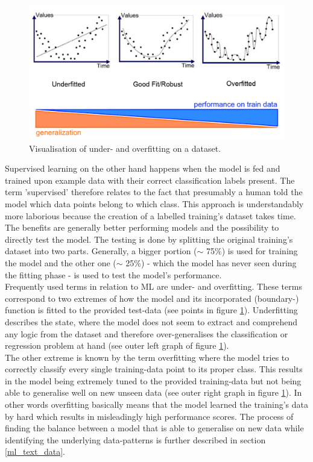 \begin{figure}[h]
   \centering
   \includegraphics[width=\textwidth]{img/over_underfitting}
   \caption{Visualisation of under- and overfitting on a dataset.}
   \label{fig:over_underfitting}
\end{figure}

Supervised learning on the other hand happens when the model is fed and trained upon example data with their correct classification labels present. The term 'supervised' therefore relates to the fact that presumably a human told the model which data points belong to which class. This approach is understandably more laborious because the creation of a labelled training's dataset takes time. The benefits are generally better performing models and the possibility to directly test the model. The testing is done by splitting the original training's dataset into two parts. Generally, a bigger portion ($\sim$ 75\%) is used for training the model and the other one ($\sim$ 25\%) - which the model has never seen during the fitting phase - is used to test the model's performance. \\
\newline
Frequently used terms in relation to ML are under- and overfitting. These terms correspond to two extremes of how the model and its incorporated (boundary-) function is fitted to the provided test-data (see points in figure \ref{fig:over_underfitting}). Underfitting describes the state, where the model does not seem to extract and comprehend any logic from the dataset and therefore over-generalises the classification or regression problem at hand (see outer left graph of figure \ref{fig:over_underfitting}). \\
The other extreme is known by the term overfitting where the model tries to correctly classify every single training-data point to its proper class. This results in the model being extremely tuned to the provided training-data but not being able to generalise well on new unseen data (see outer right graph in figure \ref{fig:over_underfitting}). In other words overfitting basically means that the model learned the training's data by hard which results in misleadingly high performance scores. The process of finding the balance between a model that is able to generalise on new data while identifying the underlying data-patterns is further described in section \ref{ml_text_data}.

